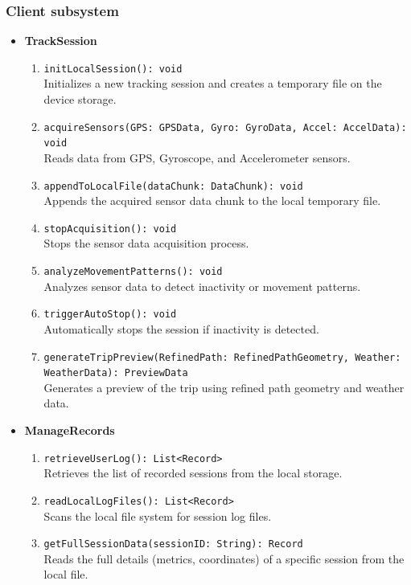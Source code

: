 \subsubsection{Client subsystem}
\begin{itemize}
    \item \textbf{TrackSession}
        \begin{enumerate}
            \item \texttt{initLocalSession(): void} \\ Initializes a new tracking session and creates a temporary file on the device storage.
            \item \texttt{acquireSensors(GPS: GPSData, Gyro: GyroData, Accel: AccelData): void} \\ Reads data from GPS, Gyroscope, and Accelerometer sensors.
            \item \texttt{appendToLocalFile(dataChunk: DataChunk): void} \\ Appends the acquired sensor data chunk to the local temporary file.
            \item \texttt{stopAcquisition(): void} \\ Stops the sensor data acquisition process.
            \item \texttt{analyzeMovementPatterns(): void} \\ Analyzes sensor data to detect inactivity or movement patterns.
            \item \texttt{triggerAutoStop(): void} \\ Automatically stops the session if inactivity is detected.
            \item \texttt{generateTripPreview(RefinedPath: RefinedPathGeometry, Weather: WeatherData): PreviewData} \\ Generates a preview of the trip using refined path geometry and weather data.
        \end{enumerate}
    \item \textbf{ManageRecords}
        \begin{enumerate}
            \item \texttt{retrieveUserLog(): List<Record>} \\ Retrieves the list of recorded sessions from the local storage.
            \item \texttt{readLocalLogFiles(): List<Record>} \\ Scans the local file system for session log files.
            \item \texttt{getFullSessionData(sessionID: String): Record} \\ Reads the full details (metrics, coordinates) of a specific session from the local file.

\end{enumerate}
\end{itemize}
